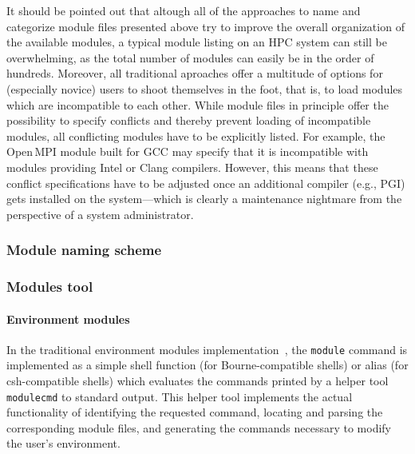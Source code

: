 It should be pointed out that altough all of the approaches to name and
categorize module files presented above try to improve the overall
organization of the available modules, a typical module listing on an HPC
system can still be overwhelming, as the total number of modules can easily
be in the order of hundreds. Moreover, all traditional aproaches offer a
multitude of options for (especially novice) users to shoot themselves in the
foot, that is, to load modules which are incompatible to each other. While
module files in principle offer the possibility to specify conflicts and
thereby prevent loading of incompatible modules, all conflicting modules have
to be explicitly listed. For example, the Open\,MPI module built for GCC may
specify that it is incompatible with modules providing Intel or Clang
compilers. However, this means that these conflict specifications have to be
adjusted once an additional compiler (e.g., PGI) gets installed on the
system---which is clearly a maintenance nightmare from the perspective of a
system administrator.


\subsubsection{Module naming scheme}
\label{sec:Module_naming_scheme}



\subsubsection{Modules tool}


\paragraph{Environment modules}

In the traditional environment modules
implementation~\cite{environment_modules_paper}, the \texttt{module} command
is implemented as a simple shell function (for Bourne-compatible shells) or
alias (for csh-compatible shells) which evaluates the commands printed by a
helper tool \texttt{modulecmd} to standard output. This helper tool
implements the actual functionality of identifying the requested command,
locating and parsing the corresponding module files, and generating the
commands necessary to modify the user's environment.

